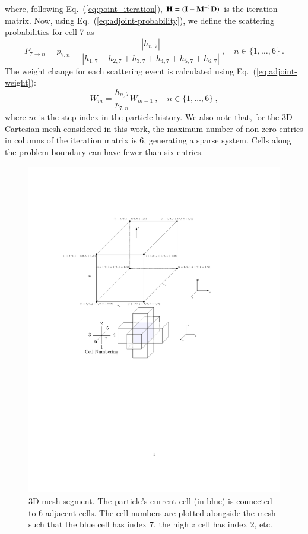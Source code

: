\documentclass[preprint,12pt]{elsarticle}
\newcommand{\vI}{\ensuremath{\ve{I}}}
\begin{document}
where, following Eq.~(\ref{eq:point_iteration}), $\ve{H} = (\vI -
\ve{M}^{-1}\ve{D})$ is the iteration matrix.  Now, using
Eq.~(\ref{eq:adjoint-probability}), we define the scattering probabilities for
cell 7 as
\begin{equation*}
  P_{7\rightarrow n} = p_{7,n} = \frac{|h_{n,7}|}{|h_{1,7} + h_{2,7} +
    h_{3,7} + h_{4,7} + h_{5,7} + h_{6,7}|}\:,\quad n\in
  \{1,\ldots,6\}\:.
\end{equation*}
The weight change for each scattering event is calculated using
Eq.~(\ref{eq:adjoint-weight}):
\begin{equation*}
  W_{m} = \frac{h_{n,7}}{p_{7,n}}W_{m-1}\:,\quad n\in
  \{1,\ldots,6\}\:,
\end{equation*}
where $m$ is the step-index in the particle history.  We also note that, for
the 3D Cartesian mesh considered in this work, the maximum number of non-zero
entries in columns of the iteration matrix is 6, generating a sparse system.
Cells along the problem boundary can have fewer than six entries.
\begin{figure}[ht!]
  \centerline{ \includegraphics[clip]{3D_mesh_segment.pdf}}
  \caption{3D mesh-segment.  The particle's current cell (in blue) is
    connected to 6 adjacent cells.  The cell numbers are plotted
    alongside the mesh such that the blue cell has index 7, the high
    $z$ cell has index 2, etc.}
  \label{fig:mesh_segment}
\end{figure}
\end{document}
